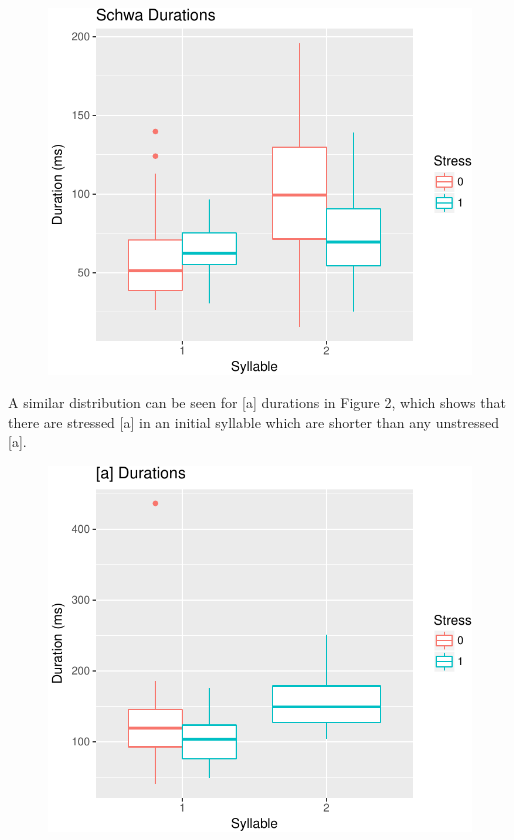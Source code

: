 \documentclass[floatsintext,man]{apa6}
\theoremstyle{definition}
\theoremstyle{definition}
\theoremstyle{definition}
\theoremstyle{remark}
\begin{document}
\begin{figure}
\centering
\includegraphics{mistress_restat_files/figure-latex/durplot-1.pdf}
\caption{}
\end{figure}

A similar distribution can be seen for {[}a{]} durations in Figure 2,
which shows that there are stressed {[}a{]} in an initial syllable which
are shorter than any unstressed {[}a{]}.

\begin{figure}
\centering
\includegraphics{mistress_restat_files/figure-latex/adurplot-1.pdf}
\caption{}
\end{figure}
\end{document}
